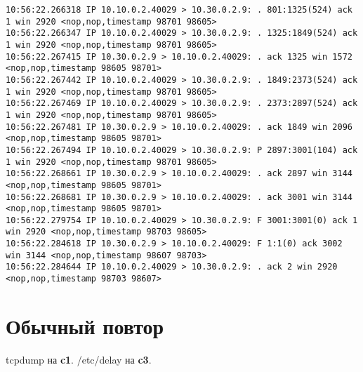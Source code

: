 \documentclass[a4paper,12pt]{article}
\begin{document}
\begin{Verbatim}
10:56:22.266318 IP 10.10.0.2.40029 > 10.30.0.2.9: . 801:1325(524) ack 1 win 2920 <nop,nop,timestamp 98701 98605>
10:56:22.266347 IP 10.10.0.2.40029 > 10.30.0.2.9: . 1325:1849(524) ack 1 win 2920 <nop,nop,timestamp 98701 98605>
10:56:22.267415 IP 10.30.0.2.9 > 10.10.0.2.40029: . ack 1325 win 1572 <nop,nop,timestamp 98605 98701>
10:56:22.267442 IP 10.10.0.2.40029 > 10.30.0.2.9: . 1849:2373(524) ack 1 win 2920 <nop,nop,timestamp 98701 98605>
10:56:22.267469 IP 10.10.0.2.40029 > 10.30.0.2.9: . 2373:2897(524) ack 1 win 2920 <nop,nop,timestamp 98701 98605>
10:56:22.267481 IP 10.30.0.2.9 > 10.10.0.2.40029: . ack 1849 win 2096 <nop,nop,timestamp 98605 98701>
10:56:22.267494 IP 10.10.0.2.40029 > 10.30.0.2.9: P 2897:3001(104) ack 1 win 2920 <nop,nop,timestamp 98701 98605>
10:56:22.268661 IP 10.30.0.2.9 > 10.10.0.2.40029: . ack 2897 win 3144 <nop,nop,timestamp 98605 98701>
10:56:22.268681 IP 10.30.0.2.9 > 10.10.0.2.40029: . ack 3001 win 3144 <nop,nop,timestamp 98605 98701>
10:56:22.279754 IP 10.10.0.2.40029 > 10.30.0.2.9: F 3001:3001(0) ack 1 win 2920 <nop,nop,timestamp 98703 98605>
10:56:22.284618 IP 10.30.0.2.9 > 10.10.0.2.40029: F 1:1(0) ack 3002 win 3144 <nop,nop,timestamp 98607 98703>
10:56:22.284644 IP 10.10.0.2.40029 > 10.30.0.2.9: . ack 2 win 2920 <nop,nop,timestamp 98703 98607>
\end{Verbatim}

\section{Обычный повтор}

tcpdump на \textbf{c1}. /etc/delay на \textbf{c3}.
\end{document}
